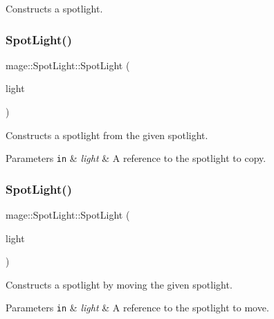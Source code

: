 Constructs a spotlight. \hypertarget{classmage_1_1_spot_light_a597abd916ed14372be208a68eb01b871}{}\label{classmage_1_1_spot_light_a597abd916ed14372be208a68eb01b871} 
\subsubsection{\texorpdfstring{Spot\+Light()}{SpotLight()}\hspace{0.1cm}{\footnotesize\ttfamily [2/3]}}
{\footnotesize\ttfamily mage\+::\+Spot\+Light\+::\+Spot\+Light (\begin{DoxyParamCaption}\item[{const \hyperlink{classmage_1_1_spot_light}{Spot\+Light} \&}]{light }\end{DoxyParamCaption})\hspace{0.3cm}{\ttfamily [default]}}

Constructs a spotlight from the given spotlight.


\begin{DoxyParams}[1]{Parameters}
\mbox{\tt in}  & {\em light} & A reference to the spotlight to copy. \\
\hline
\end{DoxyParams}
\hypertarget{classmage_1_1_spot_light_a3a5574f34f5b80cbeef00709f8a9d094}{}\label{classmage_1_1_spot_light_a3a5574f34f5b80cbeef00709f8a9d094} 
\subsubsection{\texorpdfstring{Spot\+Light()}{SpotLight()}\hspace{0.1cm}{\footnotesize\ttfamily [3/3]}}
{\footnotesize\ttfamily mage\+::\+Spot\+Light\+::\+Spot\+Light (\begin{DoxyParamCaption}\item[{\hyperlink{classmage_1_1_spot_light}{Spot\+Light} \&\&}]{light }\end{DoxyParamCaption})\hspace{0.3cm}{\ttfamily [default]}}

Constructs a spotlight by moving the given spotlight.


\begin{DoxyParams}[1]{Parameters}
\mbox{\tt in}  & {\em light} & A reference to the spotlight to move. \\
\hline
\end{DoxyParams}
\hypertarget{classmage_1_1_spot_light_aeeaba91c6448102ac6a23587c5366808}{}\label{classmage_1_1_spot_light_aeeaba91c6448102ac6a23587c5366808} 
